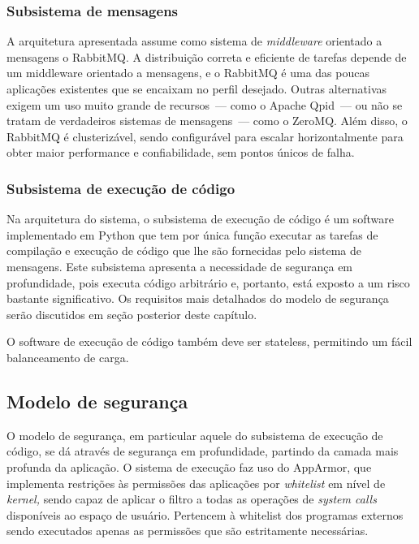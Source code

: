 \documentclass[ruledheader, 12pt]{abnt}
\begin{document}
\subsubsection{Subsistema de mensagens}

A arquitetura apresentada assume como sistema de \emph{middleware} orientado a mensagens o RabbitMQ. A distribuição correta e eficiente de tarefas depende de um middleware orientado a mensagens, e o RabbitMQ é uma das poucas aplicações existentes que se encaixam no perfil desejado. Outras alternativas exigem um uso muito grande de recursos~--- como o Apache Qpid~--- ou não se tratam de verdadeiros sistemas de mensagens~--- como o ZeroMQ. Além disso, o RabbitMQ é clusterizável, sendo configurável para escalar horizontalmente para obter maior performance e confiabilidade, sem pontos únicos de falha.

\subsubsection{Subsistema de execução de código}

Na arquitetura do sistema, o subsistema de execução de código é um software implementado em Python que tem por única função executar as tarefas de compilação e execução de código que lhe são fornecidas pelo sistema de mensagens. Este subsistema apresenta a necessidade de segurança em profundidade, pois executa código arbitrário e, portanto, está exposto a um risco bastante significativo. Os requisitos mais detalhados do modelo de segurança serão discutidos em seção posterior deste capítulo.

O software de execução de código também deve ser stateless, permitindo um fácil balanceamento de carga.

\subsection{Modelo de segurança}

O modelo de segurança, em particular aquele do subsistema de execução de código, se dá através de segurança em profundidade, partindo da camada mais profunda da aplicação. O sistema de execução faz uso do AppArmor, que implementa restrições às permissões das aplicações por \emph{whitelist} em nível de \emph{kernel,} sendo capaz de aplicar o filtro a todas as operações de \emph{system calls} disponíveis ao espaço de usuário. Pertencem à whitelist dos programas externos sendo executados apenas as permissões que são estritamente necessárias.
\end{document}

